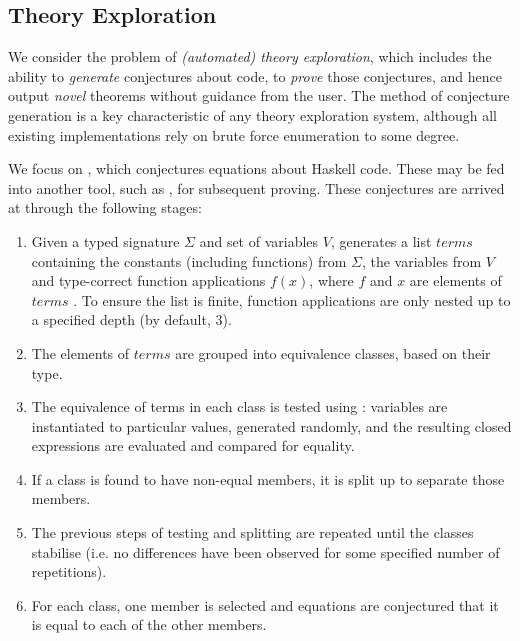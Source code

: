 \subsection{Theory Exploration}
\label{sec:theoryexploration}

We consider the problem of \emph{(automated) theory exploration}, which includes the ability to \emph{generate} conjectures about code, to \emph{prove} those conjectures, and hence output \emph{novel} theorems without guidance from the user. The method of conjecture generation is a key characteristic of any theory exploration system, although all existing implementations rely on brute force enumeration to some degree.

We focus on \qspec{} \cite{QuickSpec}, which conjectures equations about Haskell code. These may be fed into another tool, such as \hspec{}, for subsequent proving. These conjectures are arrived at through the following stages:

\iffalse TODO: Make this more formal?
 V \in Var
 F \in Fun
 T \in Term
 T ::= V | F | T1 T2

 Term ::= VAR | Const | Fun (Term)
or
 Term t ::= x | f | t t'
\fi

\begin{enumerate}
  \item Given a typed signature $\Sigma$ and set of variables $V$, \qspec{} generates a list $terms$ containing the constants (including functions) from $\Sigma$, the variables from $V$ and type-correct function applications $f(x)$, where $f$ and $x$ are elements of $terms$ \iffalse TODO: A little awkward; maybe use the above notation? \fi. To ensure the list is finite, function applications are only nested up to a specified depth (by default, 3).
  \item The elements of $terms$ are grouped into equivalence classes, based on their type.
  \item The equivalence of terms in each class is tested using \qcheck{}: variables are instantiated to particular values, generated randomly, and the resulting closed expressions are evaluated and compared for equality.
  \item If a class is found to have non-equal members, it is split up to separate those members.
  \item The previous steps of testing and splitting are repeated until the classes stabilise (i.e. no differences have been observed for some specified number of repetitions).
  \item For each class, one member is selected and equations are conjectured that it is equal to each of the other members.
\end{enumerate}

